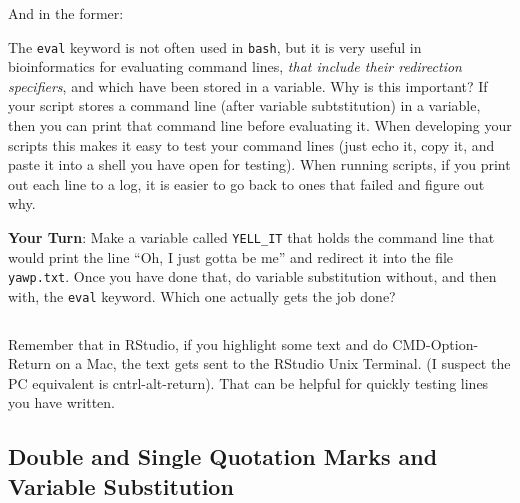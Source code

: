 \documentclass[]{krantz}
\makeatletter
\newenvironment{Shaded}{\begin{snugshade}}{\end{snugshade}}
\newcommand{\BuiltInTok}[1]{#1}
\newcommand{\CommentTok}[1]{\textcolor[rgb]{0.37,0.37,0.37}{\textit{#1}}}
\newcommand{\ExtensionTok}[1]{#1}
\newcommand{\NormalTok}[1]{#1}
\newcommand{\StringTok}[1]{\textcolor[rgb]{0.5,0.5,0.5}{#1}}
\newcommand{\VariableTok}[1]{\textcolor[rgb]{0,0,0}{#1}}
\newenvironment{kframe}{%
\medskip{}
\setlength{\fboxsep}{.8em}
 \def\at@end@of@kframe{}%
 \ifinner\ifhmode%
  \def\at@end@of@kframe{\end{minipage}}%
  \begin{minipage}{\columnwidth}%
 \fi\fi%
 \def\FrameCommand##1{\hskip\@totalleftmargin \hskip-\fboxsep
 \colorbox{shadecolor}{##1}\hskip-\fboxsep
     \hskip-\linewidth \hskip-\@totalleftmargin \hskip\columnwidth}%
 \MakeFramed {\advance\hsize-\width
   \@totalleftmargin\z@ \linewidth\hsize
   \@setminipage}}%
 {\par\unskip\endMakeFramed%
 \at@end@of@kframe}
\renewenvironment{Shaded}{\begin{kframe}}{\end{kframe}}
\let\BeginKnitrBlock\begin \let\EndKnitrBlock\end
\makeatother
\begin{document}
And in the former:

\begin{Shaded}
\end{Shaded}

\BeginKnitrBlock{rmdtip}
The \texttt{eval} keyword is not often used in \texttt{bash}, but it is very useful in bioinformatics
for evaluating command lines, \emph{that include their redirection specifiers}, and which have
been stored in a variable. Why is this important? If your script stores a command line (after
variable subtstitution) in a variable, then you can print that command line before evaluating
it. When developing your scripts this makes it easy to test your command lines (just echo it,
copy it, and paste it into a shell you have open for testing). When running scripts, if you print
out each line to a log, it is easier to go back to ones that failed and figure out why.
\EndKnitrBlock{rmdtip}

\textbf{Your Turn}: Make a variable called \texttt{YELL\_IT} that holds the command
line that would print the line ``Oh, I just gotta be me'' and redirect
it into the file \texttt{yawp.txt}. Once you have done that, do variable
substitution without, and then with, the \texttt{eval} keyword. Which one
actually gets the job done?

\begin{verbatim}
\end{verbatim}

Remember that in RStudio, if you highlight some text and do CMD-Option-Return on a Mac,
the text gets sent to the RStudio Unix Terminal. (I suspect the PC equivalent is
cntrl-alt-return). That can be helpful for quickly testing lines you have written.

\hypertarget{double-and-single-quotation-marks-and-variable-substitution}{%
\subsection{Double and Single Quotation Marks and Variable Substitution}\label{double-and-single-quotation-marks-and-variable-substitution}}
\end{document}
